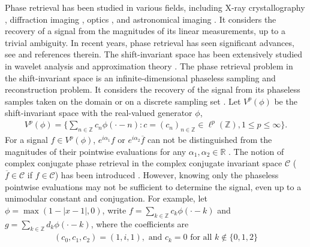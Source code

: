 \documentclass[12pt,oneside,reqno]{amsart}
\newcommand{\Z}{\mathbb{Z}}
\newcommand{\R}{\mathbb{R}}
\numberwithin{equation}{section}
\begin{document}
Phase retrieval has been studied in  various fields, including X-ray crystallography \cite{harrison1993phase,millane1990phase}, diffraction imaging \cite{bunk2007diffractive}, optics \cite{walther1963question}, and astronomical imaging \cite{dainty1987phase}.  It considers the recovery of a signal from the magnitudes of its linear measurements, up to a trivial ambiguity.  
	 In recent years, phase retrieval has seen significant advances, see \cite{alaifari2021uniqueness,balan2009painless,balan2006signal,bandeira2014saving,cahill2016phase,candes2015phase,candes2013phaselift,chen2022phase,chen2020phase,cheng2021stable,grochenig2020phase,jaming2014uniqueness,pohl2014phaseless,romero2021sign,thakur2011reconstruction} and references therein. 
	The shift-invariant space has been extensively studied in wavelet analysis and approximation theory \cite{aldroubi2000beurling, aldroubi2001nonuniform, aldroubi2005convolution,boor1994structure}. The phase retrieval problem in the shift-invariant space is an infinite-dimensional phaseless sampling and reconstruction problem. It considers the recovery of the signal from its phaseless samples taken on the domain or on a discrete sampling set \cite{chen2020phase, cheng2019phaseless,cheng2021stable2,grochenig2020phase,romero2021sign,shenoy2016exact,thakur2011reconstruction}. 
	Let $V^p(\phi)$ be the shift-invariant space with the real-valued generator $\phi$, 
	\begin{align}\label{Vspace.def}
		V^p(\phi) = \{\sum_{n\in \Z} c_n \phi(\cdot - n): c=(c_n)_{n\in \Z} \in \ell^p(\Z), 1\le p\le \infty  \}.
	\end{align}
	For a signal $f\in V^p(\phi)$, $e^{i\alpha_1}f$  or $e^{i\alpha_2}\overline{f}$
	can not be distinguished from the magnitudes of their pointwise evaluations for any $\alpha_1, \alpha_2 \in \R$ \cite{chen2024conjugate,chen2022phase,grochenig2020phase, lai2021conjugate,walther1963question}. 	
	The notion of complex conjugate phase retrieval in the complex conjugate invariant space $\mathcal{C}$ ($\overline{f} \in \mathcal{C}$ if $f\in \mathcal{C}$) has been introduced \cite{chen2024conjugate, chen2022phase,  lai2021conjugate}.  However, knowing only the  phaseless pointwise evaluations may not be sufficient to determine the signal, even up to a unimodular constant and conjugation. For example, let $\phi=\max(1-|x-1|,0)$, write $f=\sum_{k\in \Z} c_k\phi(\cdot-k)$ and $g=\sum_{k\in \Z} d_k\phi(\cdot-k)$, where the coefficients are
	\begin{align*}
		(c_0,c_1,c_2)=(1,i,1), \text{ and } c_k=0 \text{ for all } k\notin \{0,1,2\}
	\end{align*}
\end{document}
